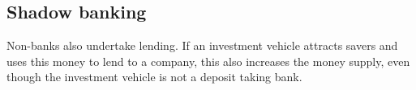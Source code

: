 
\subsection{Shadow banking}

Non-banks also undertake lending. If an investment vehicle attracts savers and uses this money to lend to a company, this also increases the money supply, even though the investment vehicle is not a deposit taking bank.

